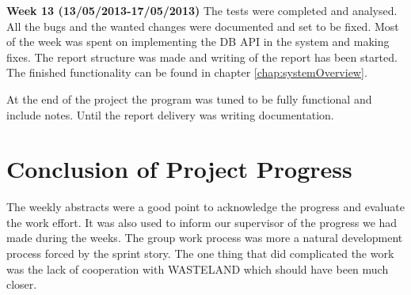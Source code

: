 \textbf{Week 13 (13/05/2013-17/05/2013)}
The tests were completed and analysed. 
All the bugs and the wanted changes were documented and set to be fixed.
Most of the week was spent on implementing the DB API in the system and making fixes.     
The report structure was made and writing of the report has been started. 
The finished functionality can be found in chapter \vref{chap:systemOverview}.
 
At the end of the project the program was tuned to be fully functional and include notes.
Until the report delivery was writing documentation.       

\section{Conclusion of Project Progress}
The weekly abstracts were a good point to acknowledge the progress and evaluate the work effort. It was also used to inform our supervisor of the progress we had made during the weeks. 
The group work process was more a natural development process forced by the sprint story.       
The one thing that did complicated the work was the lack of cooperation with WASTELAND which should have been much closer. 
\label{sec:conclusionofProjectProgress}
